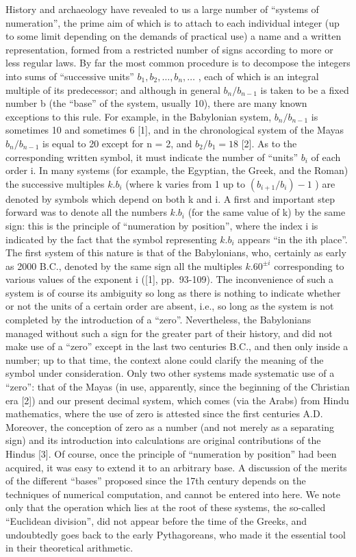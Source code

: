 History and archaeology have revealed to us a large number of ``systems of numeration'', the prime aim of which is to attach to each individual integer (up to some limit depending on the demands of practical use) a name and a written representation, formed from a restricted number of signs according to more or less regular laws. By far the most common procedure is to decompose the integers into sums of ``successive units'' \(b_{1}, b_{2}, \ldots, b_{n}, \ldots\) , each of which is an integral multiple of its predecessor; and although in general \(b_{n}/b_{n-1}\) is taken to be a fixed number b (the ``base'' of the system, usually 10), there are many known exceptions to this rule. For example, in the Babylonian system, \(b_{n}/b_{n-1}\) is sometimes 10 and sometimes 6 {[}1{]}, and in the chronological system of the Mayas \(b_{n}/b_{n-1}\) is equal to 20 except for n = 2, and \(b_{2}/b_{1} = 18\) {[}2{]}. As to the corresponding written symbol, it must indicate the number of ``units'' \(b_{i}\) of each order i. In many systems (for example, the Egyptian, the Greek, and the Roman) the successive multiples \(k.b_{i}\) (where k varies from 1 up to \((b_{i+1}/b_{i}) - 1\) ) are denoted by symbols which depend on both k and i. A first and important step forward was to denote all the numbers \(k.b_{i}\) (for the same value of k) by the same sign: this is the principle of ``numeration by position'', where the index i is indicated by the fact that the symbol representing \(k.b_{i}\) appears ``in the ith place''. The first system of this nature is that of the Babylonians, who, certainly as early as 2000 B.C., denoted by the same sign all the multiples \(k.60^{\pm i}\) corresponding to various values of the exponent i ({[}1{]}, pp.~93-109). The inconvenience of such a system is of course its ambiguity so long as there is nothing to indicate whether or not the units of a certain order are absent, i.e., so long as the system is not completed by the introduction of a ``zero''. Nevertheless, the Babylonians managed without such a sign for the greater part of their history, and did not make use of a ``zero'' except in the last two centuries B.C., and then only inside a number; up to that time, the context alone could clarify the meaning of the symbol under consideration. Only two other systems made systematic use of a ``zero'': that of the Mayas (in use, apparently, since the beginning of the Christian era {[}2{]}) and our present decimal system, which comes (via the Arabs) from Hindu mathematics, where the use of zero is attested since the first centuries A.D. Moreover, the conception of zero as a number (and not merely as a separating sign) and its introduction into calculations are original contributions of the Hindus {[}3{]}. Of course, once the principle of ``numeration by position'' had been acquired, it was easy to extend it to an arbitrary base. A discussion of the merits of the different ``bases'' proposed since the 17th century depends on the techniques of numerical computation, and cannot be entered into here. We note only that the operation which lies at the root of these systems, the so-called ``Euclidean division'', did not appear before the time of the Greeks, and undoubtedly goes back to the early Pythagoreans, who made it the essential tool in their theoretical arithmetic.

